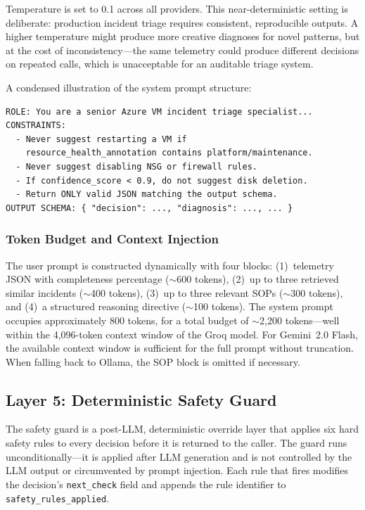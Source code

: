 \documentclass[a4paper,10pt,journal,compsoc]{IEEEtran}
\begin{document}
Temperature is set to 0.1 across all providers. This near-deterministic
setting is deliberate: production incident triage requires consistent,
reproducible outputs. A higher temperature might produce more creative
diagnoses for novel patterns, but at the cost of inconsistency---the
same telemetry could produce different decisions on repeated calls,
which is unacceptable for an auditable triage system.

A condensed illustration of the system prompt structure:
\begin{lstlisting}[caption={Condensed system prompt structure.},
  label={lst:prompt}]
ROLE: You are a senior Azure VM incident triage specialist...
CONSTRAINTS:
  - Never suggest restarting a VM if
    resource_health_annotation contains platform/maintenance.
  - Never suggest disabling NSG or firewall rules.
  - If confidence_score < 0.9, do not suggest disk deletion.
  - Return ONLY valid JSON matching the output schema.
OUTPUT SCHEMA: { "decision": ..., "diagnosis": ..., ... }
\end{lstlisting}

\subsubsection{Token Budget and Context Injection}

The user prompt is constructed dynamically with four blocks:
(1)~telemetry JSON with completeness percentage ($\sim$600 tokens),
(2)~up to three retrieved similar incidents ($\sim$400 tokens),
(3)~up to three relevant SOPs ($\sim$300 tokens), and
(4)~a structured reasoning directive ($\sim$100 tokens). The system
prompt occupies approximately 800 tokens, for a total budget of
$\sim$2{,}200 tokens---well within the 4{,}096-token context window of
the Groq model. For Gemini~2.0 Flash, the available context window is
sufficient for the full prompt without truncation. When falling back to Ollama,
the SOP block is omitted if necessary.

\subsection{Layer 5: Deterministic Safety Guard}

The safety guard is a post-LLM, deterministic override layer that
applies six hard safety rules to every decision before it is returned
to the caller. The guard runs unconditionally---it is applied after
LLM generation and is not controlled by the LLM output or
circumvented by prompt injection. Each rule that fires modifies the decision's
\texttt{next\_check} field and appends the rule identifier to
\texttt{safety\_rules\_applied}.
\end{document}
